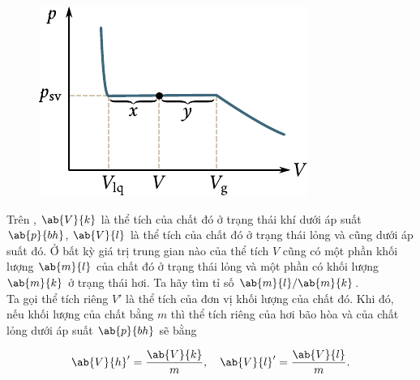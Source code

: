 \begin{figure}[!htb]
	\begin{center}
		\includegraphics[scale=1]{figures/ch_15/fig_15_3.pdf}
		\caption[]{}
		\label{fig:15_3}
	\end{center}
	\vspace{-0.8cm}
\end{figure}

Trên , $\ab{V}{k}$ là thể tích của chất đó ở trạng thái khí dưới áp suất $\ab{p}{bh}$, $\ab{V}{l}$ là thể tích của chất đó ở trạng thái lỏng và cũng dưới áp suất đó. Ở bất kỳ giá trị trung gian nào của thể tích $V$ cũng có một phần khối lượng $\ab{m}{l}$ của chất đó ở trạng thái lỏng và một phần có khối lượng $\ab{m}{k}$ ở trạng thái hơi. Ta hãy tìm tỉ số $\ab{m}{l}/\ab{m}{k}$.\\ 

Ta gọi thể tích riêng $V'$ là thể tích của đơn vị khối lượng của chất đó. Khi đó, nếu khối lượng của chất bằng $m$ thì thể tích riêng của hơi bão hòa và của chất lỏng dưới áp suất $\ab{p}{bh}$ sẽ bằng

\begin{equation}\label{eq:15_2}
    \ab{V}{h}' = \frac{\ab{V}{k}}{m},\quad \ab{V}{l}' = \frac{\ab{V}{l}}{m}.
\end{equation}

